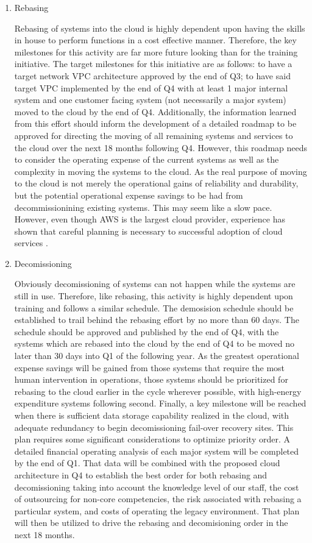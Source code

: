 \documentclass[stu]{apa7}
\begin{document}
\begin{enumerate}
\item Rebasing
\label{sec:orga5700d9}

Rebasing of systems into the cloud is highly dependent upon having the skills in house to perform functions in a cost effective manner. Therefore, the key milestones for this activity are far more future looking than for the training initiative. The target milestones for this initiative are as follows: to have a target network VPC architecture approved by the end of Q3; to have said target VPC implemented by the end of Q4 with at least 1 major internal system and one customer facing system (not necessarily a major system) moved to the cloud by the end of Q4. Additionally, the information learned from this effort should inform the development of a detailed roadmap to be approved for directing the moving of all remaining systems and services to the cloud over the next 18 months following Q4. However, this roadmap needs to consider the operating expense of the current systems as well as the complexity in moving the systems to the cloud. As the real purpose of moving to the cloud is not merely the operational gains of reliability and durability, but the potential operational expense savings to be had from decommissionining existing systems. This may seem like a slow pace. However, even though AWS is the largest cloud provider, experience has shown that careful planning is necessary to successful adoption of cloud services \citep{bromallCaseStudyBasedAnalysis2019}.

\item Decomissioning
\label{sec:org7a8f17d}

Obviously decomissioning of systems can not happen while the systems are still in use. Therefore, like rebasing, this activity is highly dependent upon training and follows a similar schedule. The demosision schedule should be established to trail behind the rebasing effort by no more than 60 days. The schedule should be approved and published by the end of Q4, with the systems which are rebased into the cloud by the end of Q4 to be moved no later than 30 days into Q1 of the following year. As the greatest operational expense savings will be gained from those systems that require the most human intervention in operations, those systems should be prioritized for rebasing to the cloud earlier in the cycle wherever possible, with high-energy expenditure systems following second. Finally, a key milestone will be reached when there is sufficient data storage capability realized in the cloud, with adequate redundancy to begin decomissioning fail-over recovery sites. This plan requires some significant considerations to optimize priority order. A detailed financial operating analysis of each major system will be completed by the end of Q1. That data will be combined with the proposed cloud architecture in Q4 to establish the best order for both rebasing and decomissioning taking into account the knowledge level of our staff, the cost of outsourcing for non-core competencies, the risk associated with rebasing a particular system, and costs of operating the legacy environment. That plan will then be utilized to drive the rebasing and decomisioning order in the next 18 months.
\end{enumerate}
\end{document}
